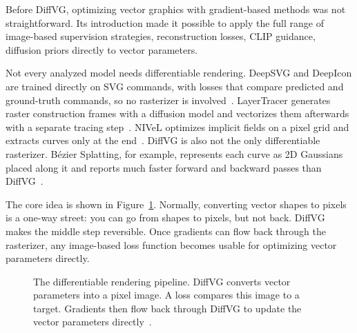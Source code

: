 Before DiffVG, optimizing vector graphics with gradient-based 
methods was not straightforward. Its introduction made it 
possible to apply the full range of image-based supervision 
strategies, reconstruction losses, CLIP guidance, diffusion 
priors directly to vector parameters.

Not every analyzed model needs differentiable rendering. 
DeepSVG and DeepIcon are trained directly on SVG commands, with 
losses that compare predicted and ground-truth commands, so no 
rasterizer is involved~\cite{carlierDeepSVGHierarchicalGenerative2020, bingDeepIconHierarchicalNetwork2024}. 
LayerTracer generates raster construction frames with a diffusion 
model and vectorizes them afterwards with a separate tracing 
step~\cite{songLayerTracerCognitiveAlignedLayered2025}. NIVeL 
optimizes implicit fields on a pixel grid and extracts curves only 
at the end~\cite{thamizharasanNIVeLNeuralImplicit2024}. DiffVG is 
also not the only differentiable rasterizer. B\'{e}zier Splatting, 
for example, represents each curve as 2D Gaussians placed along it 
and reports much faster forward and backward passes than 
DiffVG~\cite{liuBezierSplattingFast2025}.



The core idea is shown in Figure~\ref{fig:diffvg_pipeline}. 
Normally, converting vector shapes to pixels is a one-way 
street: you can go from shapes to pixels, but not back. 
DiffVG makes the middle step reversible. Once gradients 
can flow back through the rasterizer, any image-based loss 
function becomes usable for optimizing vector parameters 
directly.

\begin{figure}[htbp]
\centering
{}
\caption{The differentiable rendering pipeline. DiffVG 
converts vector parameters into a pixel image. A loss 
compares this image to a target. Gradients then flow 
back through DiffVG to update the vector parameters 
directly~\cite{liDifferentiableVectorGraphics2020a}.}
\label{fig:diffvg_pipeline}
\end{figure}

